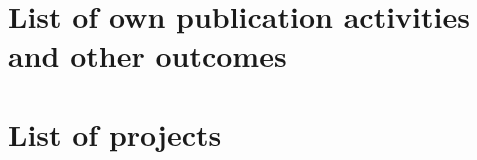 \documentclass[english,phd]{diploma}
\begin{document}
\chapter*{List of own publication activities and other outcomes}
\label{ch:listofstudentsownpublicationactivitiesandotheroutcomes}



\chapter*{List of projects}
\label{ch:listofprojects}~


\printbibliography[heading=bibintoc, title={Bibliography}]

\end{document}
